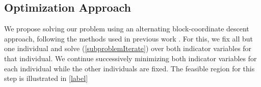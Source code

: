 \documentclass{article}
\begin{document}
\subsection{Optimization Approach}
We propose solving our problem using an alternating block-coordinate descent approach, following the methods used in previous work \cite{MB_diploidTrios, lazar_2021,MB_SingleParentDiploid}. For this,  we fix all but one individual and solve (\ref{subproblemIterate}) over both indicator variables for that individual. We continue successively minimizing both indicator variables for each individual while the other individuals are fixed. The feasible region for this step is illustrated in \ref{label}\\
\end{document}
